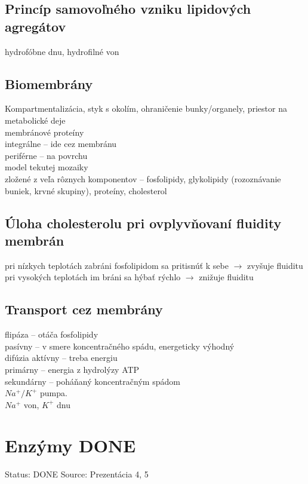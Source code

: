 \subsection{Princíp samovoľného vzniku lipidových agregátov}
hydrofóbne dnu, hydrofilné von\\
\subsection{Biomembrány}
Kompartmentalizácia, styk s okolím, ohraničenie bunky/organely, priestor na metabolické deje\\
membránové proteíny\\
\tab integrálne -- ide cez membránu\\
\tab periférne -- na povrchu\\
model tekutej mozaiky\\
\tab zložené z veľa rôznych komponentov -- fosfolipidy, glykolipidy (rozoznávanie buniek, krvné skupiny), proteíny, cholesterol\\
\subsection{Úloha cholesterolu pri ovplyvňovaní fluidity membrán}
pri nízkych teplotách zabráni fosfolipidom sa pritisnúť k sebe $\rightarrow$ zvyšuje fluiditu\\
pri vysokých teplotách im bráni sa hýbať rýchlo $\rightarrow$ znižuje fluiditu\\
\subsection{Transport cez membrány}
flipáza -- otáča fosfolipidy\\
pasívny -- v smere koncentračného spádu, energeticky výhodný\\
\tab difúzia
aktívny -- treba energiu\\
\tab primárny -- energia z hydrolýzy ATP\\
\tab sekundárny -- poháňaný koncentračným spádom\\
$Na^+/K^+$ pumpa.\\
\tab $Na^+$ von, $K^+$ dnu
\\
\section{Enzýmy DONE}

Status: DONE
Source: Prezentácia 4, 5


